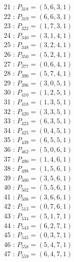\documentclass{article}
\begin{document}
{\begin{multicols}{2}
21 : $P_{318}=( 5, 6, 3, 1 )$\\
22 : $P_{319}=( 6, 6, 3, 1 )$\\
23 : $P_{322}=( 1, 7, 3, 1 )$\\
24 : $P_{340}=( 3, 1, 4, 1 )$\\
25 : $P_{348}=( 3, 2, 4, 1 )$\\
26 : $P_{350}=( 5, 2, 4, 1 )$\\
27 : $P_{377}=( 0, 6, 4, 1 )$\\
28 : $P_{390}=( 5, 7, 4, 1 )$\\
29 : $P_{396}=( 3, 0, 5, 1 )$\\
30 : $P_{410}=( 1, 2, 5, 1 )$\\
31 : $P_{418}=( 1, 3, 5, 1 )$\\
32 : $P_{420}=( 3, 3, 5, 1 )$\\
33 : $P_{423}=( 6, 3, 5, 1 )$\\
34 : $P_{425}=( 0, 4, 5, 1 )$\\
35 : $P_{439}=( 6, 5, 5, 1 )$\\
36 : $P_{462}=( 5, 0, 6, 1 )$\\
37 : $P_{490}=( 1, 4, 6, 1 )$\\
38 : $P_{498}=( 1, 5, 6, 1 )$\\
39 : $P_{500}=( 3, 5, 6, 1 )$\\
40 : $P_{502}=( 5, 5, 6, 1 )$\\
41 : $P_{508}=( 3, 6, 6, 1 )$\\
42 : $P_{513}=( 0, 7, 6, 1 )$\\
43 : $P_{534}=( 5, 1, 7, 1 )$\\
44 : $P_{543}=( 6, 2, 7, 1 )$\\
45 : $P_{545}=( 0, 3, 7, 1 )$\\
46 : $P_{558}=( 5, 4, 7, 1 )$\\
47 : $P_{559}=( 6, 4, 7, 1 )$\\
\end{multicols}
}
\end{document}
